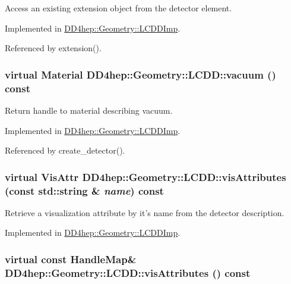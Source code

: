 Access an existing extension object from the detector element. 

Implemented in \hyperlink{class_d_d4hep_1_1_geometry_1_1_l_c_d_d_imp_adfeb342464586b682c1da99b0c2e023b}{DD4hep::Geometry::LCDDImp}.

Referenced by extension().\hypertarget{class_d_d4hep_1_1_geometry_1_1_l_c_d_d_adf89eaa970c7c23b6896f79a6ad28b7f}{
\subsubsection[{vacuum}]{\setlength{\rightskip}{0pt plus 5cm}virtual {\bf Material} DD4hep::Geometry::LCDD::vacuum () const}}
\label{class_d_d4hep_1_1_geometry_1_1_l_c_d_d_adf89eaa970c7c23b6896f79a6ad28b7f}


Return handle to material describing vacuum. 

Implemented in \hyperlink{class_d_d4hep_1_1_geometry_1_1_l_c_d_d_imp_ac1c1ef94c95b0c6e1d0bd0089a537ebe}{DD4hep::Geometry::LCDDImp}.

Referenced by create\_\-detector().\hypertarget{class_d_d4hep_1_1_geometry_1_1_l_c_d_d_a449330acbb5a5d6ba6f1fa2d97cea338}{
\subsubsection[{visAttributes}]{\setlength{\rightskip}{0pt plus 5cm}virtual {\bf VisAttr} DD4hep::Geometry::LCDD::visAttributes (const std::string \& {\em name}) const}}
\label{class_d_d4hep_1_1_geometry_1_1_l_c_d_d_a449330acbb5a5d6ba6f1fa2d97cea338}


Retrieve a visualization attribute by it's name from the detector description. 

Implemented in \hyperlink{class_d_d4hep_1_1_geometry_1_1_l_c_d_d_imp_a18c14707abd2efd108fa6ec686c74ebd}{DD4hep::Geometry::LCDDImp}.\hypertarget{class_d_d4hep_1_1_geometry_1_1_l_c_d_d_abb60505e37d62147725d126cb21d171b}{
\subsubsection[{visAttributes}]{\setlength{\rightskip}{0pt plus 5cm}virtual const {\bf HandleMap}\& DD4hep::Geometry::LCDD::visAttributes () const}}
\label{class_d_d4hep_1_1_geometry_1_1_l_c_d_d_abb60505e37d62147725d126cb21d171b}


